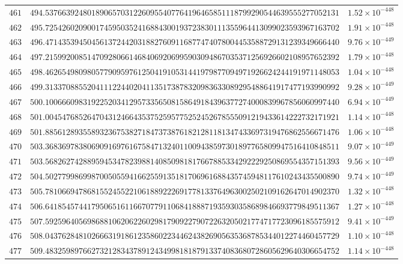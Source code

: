 \documentclass[12pt,reqno]{amsart}
\theoremstyle{remark}
\begin{document}
\begin{longtable}{clc}
$461$ & $494.5376639248018906570312260955407764196465851118799290544639555277052131$ & $1.52\times 10^{-448}$ \\
$462$ & $495.7254260209001745950352416884300193723830111355964413099023593967163702$ & $1.91\times 10^{-448}$ \\
$463$ & $496.4714353945045613724420318827609116877474078004453588729131239349666440$ & $9.76\times 10^{-449}$ \\
$464$ & $497.2159920085147092806614684069206995903094867035371256926602108957652392$ & $1.79\times 10^{-448}$ \\
$465$ & $498.4626549809805779095976125041910531441979877094971926624244191971148053$ & $1.04\times 10^{-448}$ \\
$466$ & $499.3133708855204111224402041135173878320983633089295488641917477193990992$ & $9.28\times 10^{-449}$ \\
$467$ & $500.1006660983192252034129573356508158649184396377274000839967856060997440$ & $6.94\times 10^{-449}$ \\
$468$ & $501.0045476852647043124664353752595775252452678555091219433614222732171921$ & $1.14\times 10^{-448}$ \\
$469$ & $501.8856128935589323675382718473738761821281181347433697319476862556671476$ & $1.06\times 10^{-448}$ \\
$470$ & $503.3683697838069091697616758471324011009438597301897765809947516410848511$ & $9.07\times 10^{-449}$ \\
$471$ & $503.5682627428895945347823988140850981817667885334292229250869554357151393$ & $9.56\times 10^{-449}$ \\
$472$ & $504.5027799869987005055941662559135181706961688435745948117610243435500890$ & $9.74\times 10^{-449}$ \\
$473$ & $505.7810669478681552455221061889222691778133764963002502109162647014902370$ & $1.32\times 10^{-448}$ \\
$474$ & $506.6418545744179506516116670779110684188871935930358689846693779849511367$ & $1.27\times 10^{-448}$ \\
$475$ & $507.5925964056986881062062260298179092279072263205021774717723096185575912$ & $9.41\times 10^{-449}$ \\
$476$ & $508.0437628481026663191861235860223446243826905635368785344012274460457729$ & $1.10\times 10^{-448}$ \\
$477$ & $509.4832598976627321283437891243499818187913374083680728605629640306654752$ & $1.14\times 10^{-448}$ \\

\end{longtable}
\end{document}
